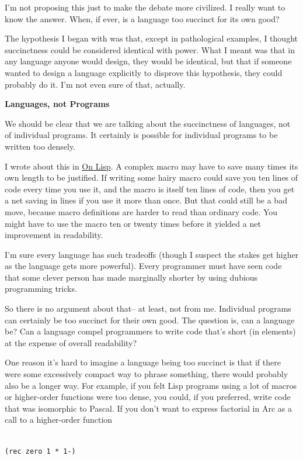 I'm not proposing this just to make the debate more civilized. I really
want to know the answer. When, if ever, is a language too succinct for
its own good?

The hypothesis I began with was that, except in pathological examples, I
thought succinctness could be considered identical with power. What I
meant was that in any language anyone would design, they would be
identical, but that if someone wanted to design a language explicitly to
disprove this hypothesis, they could probably do it. I'm not even sure
of that, actually.

\textbf{Languages, not Programs}

We should be clear that we are talking about the succinctness of
languages, not of individual programs. It certainly is possible for
individual programs to be written too densely.

I wrote about this in \href{onlisp.html}{On Lisp}. A complex macro may
have to save many times its own length to be justified. If writing some
hairy macro could save you ten lines of code every time you use it, and
the macro is itself ten lines of code, then you get a net saving in
lines if you use it more than once. But that could still be a bad move,
because macro definitions are harder to read than ordinary code. You
might have to use the macro ten or twenty times before it yielded a net
improvement in readability.

I'm sure every language has such tradeoffs (though I suspect the stakes
get higher as the language gets more powerful). Every programmer must
have seen code that some clever person has made marginally shorter by
using dubious programming tricks.

So there is no argument about that-- at least, not from me. Individual
programs can certainly be too succinct for their own good. The question
is, can a language be? Can a language compel programmers to write code
that's short (in elements) at the expense of overall readability?

One reason it's hard to imagine a language being too succinct is that if
there were some excessively compact way to phrase something, there would
probably also be a longer way. For example, if you felt Lisp programs
using a lot of macros or higher-order functions were too dense, you
could, if you preferred, write code that was isomorphic to Pascal. If
you don't want to express factorial in Arc as a call to a higher-order
function

\begin{verbatim}

(rec zero 1 * 1-)
\end{verbatim}

